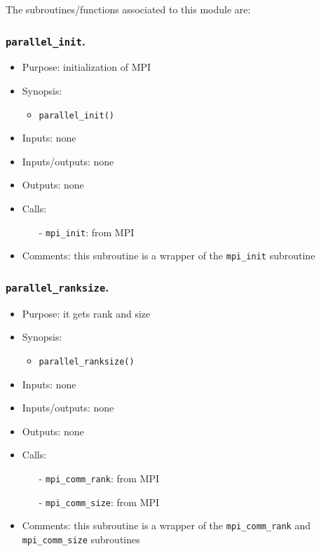 \documentclass[12pt]{article}
\begin{document}
The subroutines/functions associated to this module are:

\subsubsection{{\tt parallel\_init}.}
\begin{itemize}
\item Purpose: initialization of MPI
\item Synopsis: 
\begin{itemize}
\item {\tt parallel\_init()}
\end{itemize}
\item Inputs: none
\item Inputs/outputs: none
\item Outputs: none
\item Calls: 
\begin{itemize}
\item[-] {\tt mpi\_init}: from MPI
\end{itemize}
\item Comments: this subroutine is a wrapper of the {\tt mpi\_init} subroutine
\end{itemize} 

\subsubsection{{\tt parallel\_ranksize}.}
\begin{itemize}
\item Purpose: it gets rank and size 
\item Synopsis: 
\begin{itemize}
\item {\tt parallel\_ranksize()}
\end{itemize}
\item Inputs: none
\item Inputs/outputs: none
\item Outputs: none
\item Calls: 
\begin{itemize}
\item[-] {\tt mpi\_comm\_rank}: from MPI
\item[-] {\tt mpi\_comm\_size}: from MPI
\end{itemize}
\item Comments: this subroutine is a wrapper of the {\tt mpi\_comm\_rank} and {\tt mpi\_comm\_size} subroutines
\end{itemize} 
\end{document}
